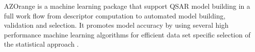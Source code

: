 AZOrange is a machine learning package that support QSAR model building in a full work flow from descriptor computation to automated model building, validation and selection. It promotes model accuracy by using several high performance machine learning algorithms for efficient data set specific selection of the statistical approach \cite{St_lring_2011}.